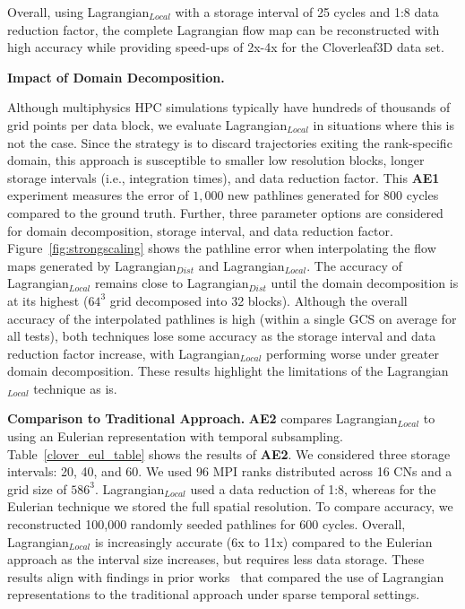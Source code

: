 



Overall, using Lagrangian$_{Local}$ with a storage interval of 25 cycles and 1:8 data reduction factor, the complete Lagrangian flow map can be reconstructed with high accuracy while providing speed-ups of 2x-4x for the Cloverleaf3D data set.

\textbf{Impact of Domain Decomposition.}
%

%
Although multiphysics HPC simulations typically have hundreds of thousands of grid points per data block, we evaluate Lagrangian$_{Local}$ in situations where this is not the case.
%
Since the strategy is to discard trajectories exiting the rank-specific domain, this approach is susceptible to smaller low resolution blocks, longer storage intervals (i.e., integration times), and data reduction factor.
%
This \textbf{AE1} experiment measures the error of $1,000$ new pathlines generated for 800 cycles compared to the ground truth. 
%
Further, three parameter options are considered for domain decomposition, storage interval, and data reduction factor. 
%
Figure~\ref{fig:strongscaling} shows the pathline error when interpolating the flow maps generated by Lagrangian$_{Dist}$ and Lagrangian$_{Local}$. 
%
The accuracy of Lagrangian$_{Local}$ remains close to Lagrangian$_{Dist}$ until the domain decomposition is at its highest ($64^{3}$ grid decomposed into 32 blocks).
%
%
Although the overall accuracy of the interpolated pathlines is high (within a single GCS on average for all tests), both techniques lose some accuracy as the storage interval and data reduction factor increase, with Lagrangian$_{Local}$ performing worse under greater domain decomposition.
%
These results highlight the limitations of the Lagrangian$_{Local}$ technique as is.
%

\textbf{Comparison to Traditional Approach.}
\textbf{AE2} compares Lagrangian$_{Local}$ to using an Eulerian representation with temporal subsampling.
%
Table~\ref{clover_eul_table} shows the results of \textbf{AE2}.
%
We considered three storage intervals: 20, 40, and 60.
%
We used 96 MPI ranks distributed across 16 CNs and a grid size of $586^3$.
%
Lagrangian$_{Local}$ used a data reduction of 1:8, whereas for the Eulerian technique we stored the full spatial resolution.
%
To compare accuracy, we reconstructed 100,000 randomly seeded pathlines for 600 cycles.
%
%
Overall, Lagrangian$_{Local}$ is increasingly accurate (6x to 11x) compared to the Eulerian approach as the interval size increases, but requires less data storage.
%
These results align with findings in prior works~\cite{agranovsky2014improved, sane2018revisiting} that compared the use of Lagrangian representations to the traditional approach under sparse temporal settings.



